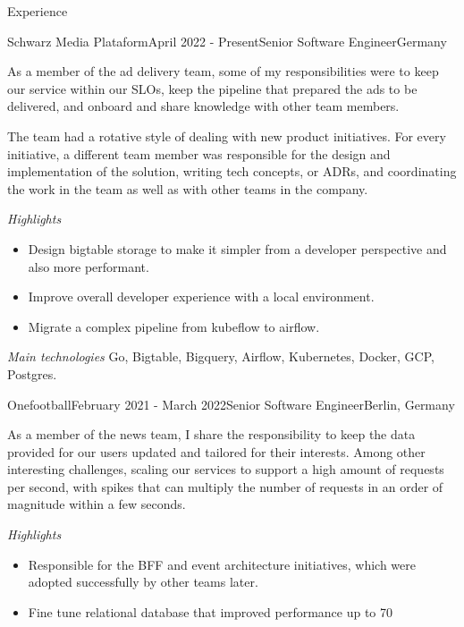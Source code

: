 \documentclass[
	a4paper, %
	10pt, %
]{resume} %
\begin{document}
\begin{rSection}{Experience}

	\begin{rSubsection}{Schwarz Media Plataform}{April 2022 - Present}{Senior Software Engineer}{Germany}
		\item[]
		As a member of the ad delivery team, some of my responsibilities were to keep our service within our SLOs, keep the pipeline that prepared the ads to be delivered,
		and onboard and share knowledge with other team members.

		The team had a rotative style of dealing with new product initiatives. For every initiative, a different team member was responsible for the design and implementation of the solution,
		writing tech concepts, or ADRs, and coordinating the work in the team as well as with other teams in the company.

		\textit{Highlights}
		\begin{itemize}
			\item Design bigtable storage to make it simpler from a developer perspective and also more performant.
			\item Improve overall developer experience with a local environment.
			\item Migrate a complex pipeline from kubeflow to airflow.
		\end{itemize}

		\textit{Main technologies}
			Go, Bigtable, Bigquery, Airflow, Kubernetes, Docker, GCP, Postgres.

	\end{rSubsection}

	\vspace{1mm}

	\begin{rSubsection}{Onefootball}{February 2021 - March 2022}{Senior Software Engineer}{Berlin, Germany}
		\item[]
		As a member of the news team, I share the responsibility to keep the data provided for our users updated and tailored for their interests.
		Among other interesting challenges, scaling our services to support a high amount of requests per second, with spikes that can multiply the number of requests in an order of magnitude within a few seconds.

		\textit{Highlights}
		\begin{itemize}
			\item Responsible for the BFF and event architecture initiatives, which were adopted successfully by other teams later.
			\item Fine tune relational database that improved performance up to 70%
		\end{itemize}


\end{rSubsection}
\end{rSection}
\end{document}
